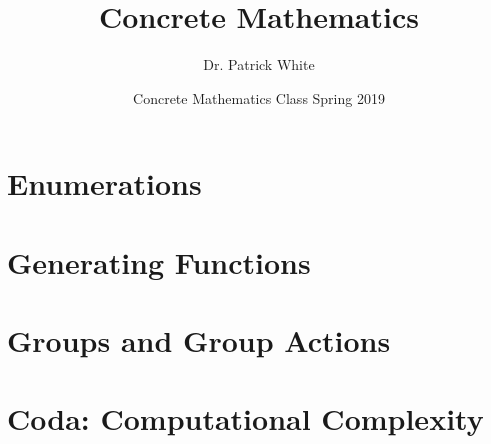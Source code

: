 \documentclass[12pt, titlepage]{article}
\title{Concrete Mathematics}
\author{Dr. Patrick White}
\date{Concrete Mathematics Class Spring 2019} %
\begin{document}
\maketitle

\tableofcontents

\newpage 



\newpage



\newpage 

\part{Enumerations}













 







\newpage 

\part{Generating Functions}
% 

\part{Groups and Group Actions}

\part{Coda: Computational Complexity}
\end{document}
